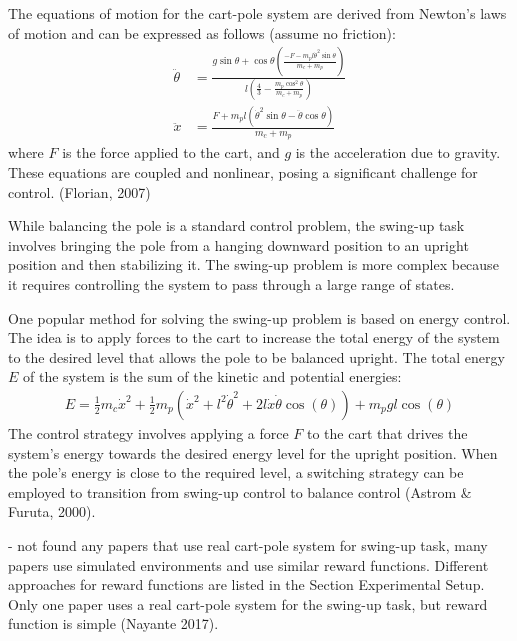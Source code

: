The equations of motion for the cart-pole system are derived from Newton's laws of motion and can be expressed as follows (assume no friction):
\begin{align}
    \ddot{\theta} &= \frac{g\sin\theta + \cos\theta\left(\frac{-F-m_pl\dot{\theta}^2\sin\theta}{m_c+m_p}\right)}{l\left(\frac{4}{3}-\frac{m_p\cos^2\theta}{m_c+m_p}\right)} \\
    \ddot{x} &= \frac{F+m_pl(\dot{\theta}^2\sin\theta-\ddot{\theta}\cos\theta)}{m_c+m_p}
\end{align}
where $F$ is the force applied to the cart, and $g$ is the acceleration due to gravity. These equations are coupled and nonlinear, posing a significant challenge for control. (Florian, 2007)

While balancing the pole is a standard control problem, the swing-up task involves bringing the pole from a hanging downward position to an upright position and then stabilizing it. The swing-up problem is more complex because it requires controlling the system to pass through a large range of states.

One popular method for solving the swing-up problem is based on energy control. The idea is to apply forces to the cart to increase the total energy of the system to the desired level that allows the pole to be balanced upright. The total energy $E$ of the system is the sum of the kinetic and potential energies:
\begin{align}
    E = \frac{1}{2}m_c\dot{x}^2 + \frac{1}{2}m_p(\dot{x}^2 + l^2\dot{\theta}^2 + 2l\dot{x}\dot{\theta}\cos(\theta)) + m_pgl\cos(\theta)
\end{align}
The control strategy involves applying a force $F$ to the cart that drives the system's energy towards the desired energy level for the upright position. When the pole's energy is close to the required level, a switching strategy can be employed to transition from swing-up control to balance control (Astrom & Furuta, 2000).

- not found any papers that use real cart-pole system for swing-up task, many papers use simulated environments and use similar reward functions. Different approaches for reward functions are listed in the Section Experimental Setup. Only one paper uses a real cart-pole system for the swing-up task, but reward function is simple (Nayante 2017).
